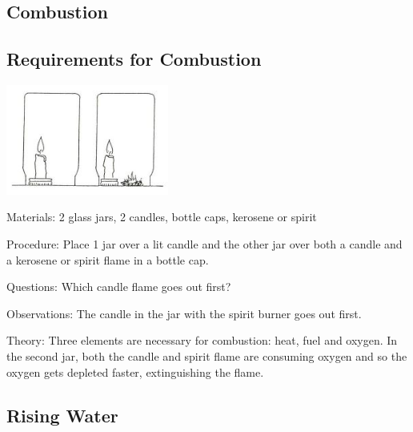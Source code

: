 \begin{multicols}{2}

\section*{Combustion} 


\subsection{Requirements for Combustion}

\begin{center}
\includegraphics[width=0.4\textwidth]{./img/source/flame-extinguisher.jpg}
\end{center}

\begin{description*}
\item[Materials:]{2 glass jars, 2 candles, bottle caps, kerosene or spirit}
\item[Procedure:]{Place 1 jar over a lit candle and the other jar over both a candle and a kerosene or spirit flame in a bottle cap.}
\item[Questions:]{Which candle flame goes out first?}
\item[Observations:]{The candle in the jar with the spirit burner goes out first.}
\item[Theory:]{Three elements are necessary for combustion: heat, fuel and oxygen. In the second jar, both the candle and spirit flame are consuming oxygen and so the oxygen gets depleted faster, extinguishing the flame.}
\end{description*}

\subsection{Rising Water}


\end{multicols}
